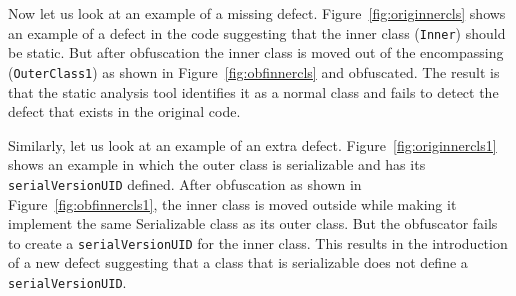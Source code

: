 \documentclass[twocolumn]{article}
\begin{document}
% 	
%  
% 
% 

Now let us look at an example of a missing defect. Figure~\ref{fig:originnercls} shows an example of a defect in the code suggesting that the inner 
class ({\tt Inner}) should be static. But after obfuscation the inner class is moved out of the encompassing ({\tt OuterClass1}) as shown in 
Figure~\ref{fig:obfinnercls} and obfuscated. The result is that the static analysis tool identifies it as a normal class and fails to detect the 
defect that exists in the original code.

Similarly, let us look at an example of an extra defect. Figure~\ref{fig:originnercls1} shows an example in which the outer class is serializable
and has its {\tt serialVersionUID} defined. After obfuscation as shown in Figure~\ref{fig:obfinnercls1}, the inner class is moved outside while making it 
implement the same Serializable class as its outer class. But the obfuscator fails to create a {\tt serialVersionUID} for the inner class. This results in the
introduction of a new defect suggesting that a class that is serializable does not define a {\tt serialVersionUID}.
\end{document}
